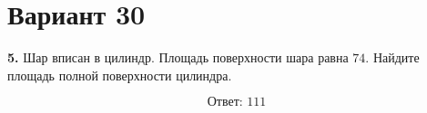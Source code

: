 \documentclass[12pt,a4paper]{article}
\begin{document}
\section*{Вариант 30}

\textbf{5.} Шар вписан в цилиндр. Площадь поверхности шара равна \(74\).
Найдите площадь полной поверхности цилиндра.

\begin{center}
\end{center}

\[
\boxed{\text{Ответ: }111}
\]
\end{document}
